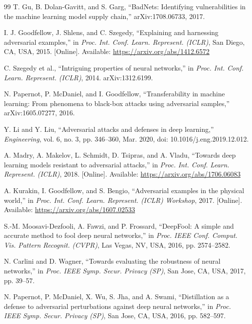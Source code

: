 \documentclass[12pt]{article}
\begin{document}
\begin{thebibliography}{99}
 T. Gu, B. Dolan-Gavitt, and S. Garg, ``BadNets: Identifying vulnerabilities in the machine learning model supply chain,'' arXiv:1708.06733, 2017.

 I. J. Goodfellow, J. Shlens, and C. Szegedy, ``Explaining and harnessing adversarial examples,'' in \textit{Proc. Int. Conf. Learn. Represent. (ICLR)}, San Diego, CA, USA, 2015. [Online]. Available: \url{https://arxiv.org/abs/1412.6572}

 C. Szegedy et al., ``Intriguing properties of neural networks,'' in \textit{Proc. Int. Conf. Learn. Represent. (ICLR)}, 2014. arXiv:1312.6199.

 N. Papernot, P. McDaniel, and I. Goodfellow, ``Transferability in machine learning: From phenomena to black-box attacks using adversarial samples,'' arXiv:1605.07277, 2016.

 Y. Li and Y. Liu, ``Adversarial attacks and defenses in deep learning,'' \textit{Engineering}, vol. 6, no. 3, pp. 346--360, Mar. 2020, doi: 10.1016/j.eng.2019.12.012.

 A. Madry, A. Makelov, L. Schmidt, D. Tsipras, and A. Vladu, ``Towards deep learning models resistant to adversarial attacks,'' in \textit{Proc. Int. Conf. Learn. Represent. (ICLR)}, 2018. [Online]. Available: \url{https://arxiv.org/abs/1706.06083}

 A. Kurakin, I. Goodfellow, and S. Bengio, ``Adversarial examples in the physical world,'' in \textit{Proc. Int. Conf. Learn. Represent. (ICLR) Workshop}, 2017. [Online]. Available: \url{https://arxiv.org/abs/1607.02533}

 S.-M. Moosavi-Dezfooli, A. Fawzi, and P. Frossard, ``DeepFool: A simple and accurate method to fool deep neural networks,'' in \textit{Proc. IEEE Conf. Comput. Vis. Pattern Recognit. (CVPR)}, Las Vegas, NV, USA, 2016, pp. 2574--2582.

 N. Carlini and D. Wagner, ``Towards evaluating the robustness of neural networks,'' in \textit{Proc. IEEE Symp. Secur. Privacy (SP)}, San Jose, CA, USA, 2017, pp. 39--57.

 N. Papernot, P. McDaniel, X. Wu, S. Jha, and A. Swami, ``Distillation as a defense to adversarial perturbations against deep neural networks,'' in \textit{Proc. IEEE Symp. Secur. Privacy (SP)}, San Jose, CA, USA, 2016, pp. 582--597.


\end{thebibliography}
\end{document}
